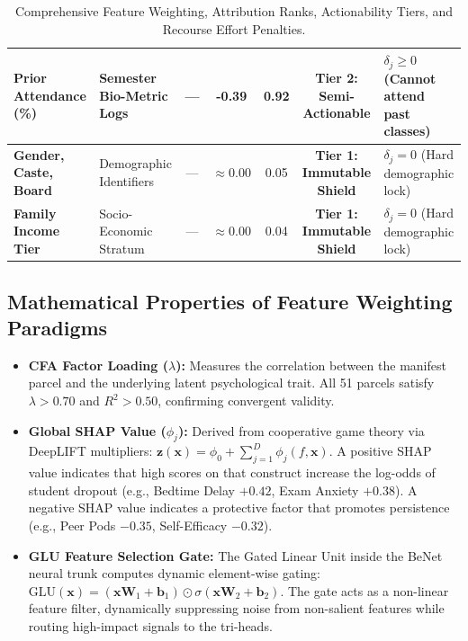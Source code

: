 \documentclass[10pt,a4paper]{article}
\begin{document}
\begin{table}[h!]
\begin{tabularx}{\textwidth}{p{3.2cm}p{3.1cm}cccc>{\raggedright\arraybackslash}X}
\rowcolor{PurpleLight} \textbf{Prior Attendance (\%)} & Semester Bio-Metric Logs & --- & \textbf{-0.39} & 0.92 & \textbf{Tier 2: Semi-Actionable} & $\delta_j \ge 0$ (Cannot attend past classes) \\
\midrule
\rowcolor{CanvasBorder} \textbf{Gender, Caste, Board} & Demographic Identifiers & --- & $\approx 0.00$ & 0.05 & \textbf{Tier 1: Immutable Shield} & $\delta_j = 0$ (Hard demographic lock) \\
\rowcolor{CanvasBorder} \textbf{Family Income Tier} & Socio-Economic Stratum & --- & $\approx 0.00$ & 0.04 & \textbf{Tier 1: Immutable Shield} & $\delta_j = 0$ (Hard demographic lock) \\
\bottomrule
\end{tabularx}
\caption{Comprehensive Feature Weighting, Attribution Ranks, Actionability Tiers, and Recourse Effort Penalties.}
\end{table}

\subsection{Mathematical Properties of Feature Weighting Paradigms}
\begin{itemize}[noitemsep, topsep=2pt]
  \item \textbf{CFA Factor Loading ($\lambda$):} Measures the correlation between the manifest parcel and the underlying latent psychological trait. All 51 parcels satisfy $\lambda > 0.70$ and $R^2 > 0.50$, confirming convergent validity.
  \item \textbf{Global SHAP Value ($\phi_j$):} Derived from cooperative game theory via DeepLIFT multipliers:
  $\mathbf{z}(\mathbf{x}) = \phi_0 + \sum_{j=1}^D \phi_j(f, \mathbf{x})$.
  A positive SHAP value indicates that high scores on that construct increase the log-odds of student dropout (e.g., Bedtime Delay $+0.42$, Exam Anxiety $+0.38$). A negative SHAP value indicates a protective factor that promotes persistence (e.g., Peer Pods $-0.35$, Self-Efficacy $-0.32$).
  \item \textbf{GLU Feature Selection Gate:} The Gated Linear Unit inside the BeNet neural trunk computes dynamic element-wise gating:
  $\text{GLU}(\mathbf{x}) = (\mathbf{x}\mathbf{W}_1 + \mathbf{b}_1) \odot \sigma(\mathbf{x}\mathbf{W}_2 + \mathbf{b}_2)$.
  The gate acts as a non-linear feature filter, dynamically suppressing noise from non-salient features while routing high-impact signals to the tri-heads.
\end{itemize}
\end{document}
